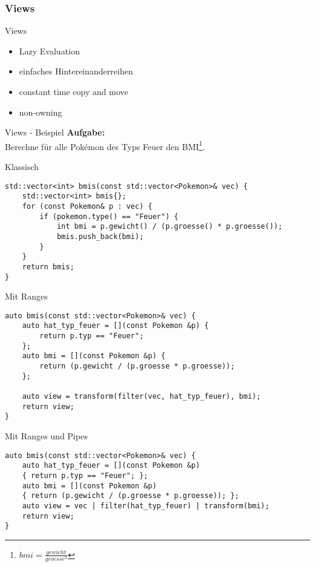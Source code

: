 \subsubsection{Views}

\begin{frame}{Views}
    \begin{itemize}
        \item<1-> Lazy Evaluation
        \item<2-> einfaches Hintereinanderreihen
        \item<3-> constant time copy and move
        \item<4-> non-owning
    \end{itemize}
\end{frame}

\begin{frame}{Views - Beispiel}
    \textbf{Aufgabe:}\\
    Berechne für alle Pokémon des Typs Feuer den BMI\footnote{$bmi = \frac{gewicht}{groesse^2}$}.
\end{frame}

\begin{frame}[fragile]{Klassisch}
    \begin{verbatim}
std::vector<int> bmis(const std::vector<Pokemon>& vec) {
    std::vector<int> bmis{};
    for (const Pokemon& p : vec) {
        if (pokemon.type() == "Feuer") {
            int bmi = p.gewicht() / (p.groesse() * p.groesse());
            bmis.push_back(bmi);
        }
    }
    return bmis;
}
\end{verbatim}
\end{frame}


\begin{frame}[fragile]{Mit Ranges}
    \begin{verbatim}
auto bmis(const std::vector<Pokemon>& vec) {
    auto hat_typ_feuer = [](const Pokemon &p) {
        return p.typ == "Feuer";
    };
    auto bmi = [](const Pokemon &p) {
        return (p.gewicht / (p.groesse * p.groesse));
    };
    
    auto view = transform(filter(vec, hat_typ_feuer), bmi);
    return view;
}
\end{verbatim}
\end{frame}

\begin{frame}[fragile]{Mit Ranges und Pipes}
    \begin{verbatim}
auto bmis(const std::vector<Pokemon>& vec) {
    auto hat_typ_feuer = [](const Pokemon &p)
    { return p.typ == "Feuer"; };
    auto bmi = [](const Pokemon &p)
    { return (p.gewicht / (p.groesse * p.groesse)); };
    auto view = vec | filter(hat_typ_feuer) | transform(bmi);
    return view;
}
\end{verbatim}
\end{frame}

